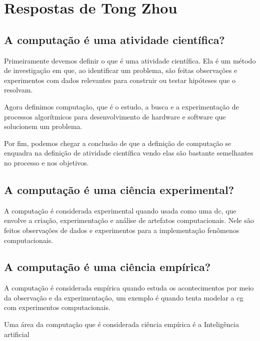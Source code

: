 \section{Respostas de Tong Zhou}

\subsection{A computação é uma atividade científica?}

Primeiramente devemos definir o que é uma atividade científica. Ela é um método de investigação em que, ao identificar um problema, são feitas observações e experimentos com dados relevantes para construir ou testar hipóteses que o resolvam.

Agora definimos computação, que é o estudo, a busca e a experimentação de processos algorítmicos para desenvolvimento de hardware e software que solucionem um problema. 

   
Por fim, podemos chegar a conclusão de que a definição de computação se enquadra na definição de atividade científica vendo elas são bastante semelhantes no processo e nos objetivos. 

\subsection{A computação é uma ciência experimental?}

A computação é considerada experimental quando usada como uma \gls{dc}, que envolve a criação, experimentação e análise de artefatos computacionais. Nele são feitos observações de dados e  experimentos para a implementação fenômenos computacionais.


\subsection{A computação é uma ciência empírica?}

A computação é considerada empírica quando estuda os acontecimentos por meio da observação e da experimentação, um exemplo é quando tenta modelar a \gls{cg} com experimentos computacionais. 


Uma área da computação que é considerada ciência empírica é a Inteligência artificial

